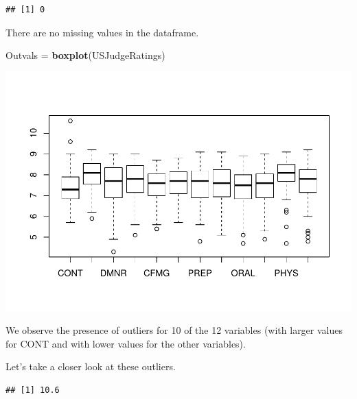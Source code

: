 \documentclass[]{article}
\newenvironment{Shaded}{\begin{snugshade}}{\end{snugshade}}
\newcommand{\KeywordTok}[1]{\textcolor[rgb]{0.13,0.29,0.53}{\textbf{#1}}}
\newcommand{\NormalTok}[1]{#1}
\newcommand{\OperatorTok}[1]{\textcolor[rgb]{0.81,0.36,0.00}{\textbf{#1}}}
\newcommand{\StringTok}[1]{\textcolor[rgb]{0.31,0.60,0.02}{#1}}
\begin{document}
\begin{verbatim}
## [1] 0
\end{verbatim}

There are no missing values in the dataframe.

\begin{Shaded}
\begin{Highlighting}[]
\NormalTok{Outvals =}\StringTok{ }\KeywordTok{boxplot}\NormalTok{(USJudgeRatings)}
\end{Highlighting}
\end{Shaded}

\includegraphics{Homework_Adrien_Toulouse_Paul-Antoine_Girard_files/figure-latex/boxplot-1.pdf}

We observe the presence of outliers for 10 of the 12 variables (with
larger values for CONT and with lower values for the other variables).

Let's take a closer look at these outliers.

\begin{Shaded}
\end{Shaded}

\begin{verbatim}
## [1] 10.6
\end{verbatim}

\begin{Shaded}
\end{Shaded}
\end{document}
